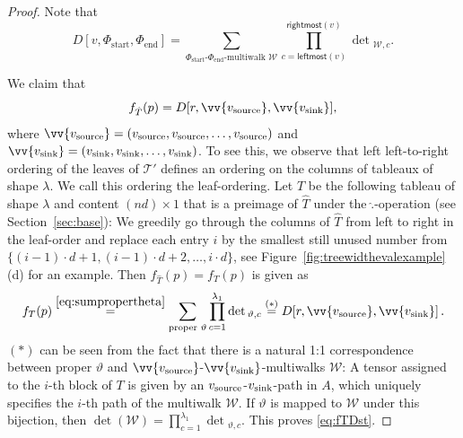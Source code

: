 \documentclass[10pt,a4paper]{article}
\numberwithin{equation}{section}
\theoremstyle{definition}
\newcommand{\CT}{\mathcal{T}}
\newcommand{\CW}{\mathcal{W}}
\newcommand{\la}{\lambda}
\begin{document}
\begin{proof}
Note that
\begin{equation}\label{def:DII}
D[v,\Phi_\text{start},\Phi_\text{end}] =
\sum_{\Phi_\text{start}\text{-}\Phi_\text{end}\text{-multiwalk } \CW} \prod_{c=\textsf{leftmost}(v)}^{\textsf{rightmost}(v)} \det{}_{\CW,c}.
\end{equation}


We claim that
\begin{equation}\label{eq:fTDst}
f_{\hat T}(p) = D[r, \vv{v_\textup{source}}, \vv{v_{\textup{sink}}}],
\end{equation}
where $\vv{v_{\textup{source}}} = (v_{\textup{source}},v_{\textup{source}},\ldots,v_{\textup{source}})$ and $\vv{v_{\textup{sink}}} = (v_{\textup{sink}},v_{\textup{sink}},\ldots,v_{\textup{sink}})$. To see this,
we observe that left left-to-right ordering of the leaves of $\CT'$ defines an ordering on the columns of tableaux of shape $\la$. We call this ordering the leaf-ordering.
Let $T$ be the following tableau of shape $\la$ and content $(nd) \times 1$ that is a preimage of $\hat T$ under the $\hat.$-operation (see Section~\ref{sec:base}):
We greedily go through the columns of $\hat T$ from left to right in the leaf-order and replace each entry $i$ by the smallest still unused number from $\{(i-1) \cdot d + 1, (i-1) \cdot d + 2, \ldots, i \cdot d\}$, see Figure~\ref{fig:treewidthevalexample}(d) for an example.
Then $f_{\hat{T}}(p) = f_{T}(p)$ is given as
\begin{align*}
    f_{T}(p) \stackrel{\eqref{eq:sumpropertheta}}{=} \sum_{\text{proper\ }\vartheta} \prod_{c = 1}^{\lambda_1}\det{}_{\vartheta, c} \stackrel{(\ast)}{=} D[r, \vv{v_{\textup{source}}}, \vv{v_{\textup{sink}}}]\,.
\end{align*}
$(\ast)$ can be seen from the fact that there is a natural 1:1 correspondence between proper $\vartheta$ and $\vv{v_{\textup{source}}}$-$\vv{v_{\textup{sink}}}$-multiwalks $\CW$: A tensor assigned to the $i$-th block of $T$
is given by an $v_{\textup{source}}$-$v_{\textup{sink}}$-path in $A$, which uniquely specifies the $i$-th path of the multiwalk $\CW$.
If $\vartheta$ is mapped to $\CW$ under this bijection, then $\det(\CW) = \prod_{c = 1}^{\lambda_1}\det{}_{\vartheta, c}$.
This proves \eqref{eq:fTDst}.


\end{proof}
\end{document}
